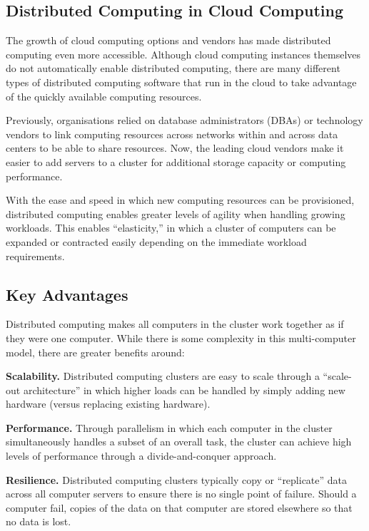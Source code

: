 \documentclass[../report.tex]{subfiles}
\begin{document}
\subsection{Distributed Computing in Cloud Computing}

The growth of cloud computing options and vendors has made distributed computing even more accessible. Although cloud computing instances themselves do not automatically enable distributed computing, there are many different types of distributed computing software that run in the cloud to take advantage of the quickly available computing resources.

Previously, organisations relied on database administrators (DBAs) or technology vendors to link computing resources across networks within and across data centers to be able to share resources. Now, the leading cloud vendors make it easier to add servers to a cluster for additional storage capacity or computing performance.

With the ease and speed in which new computing resources can be provisioned, distributed computing enables greater levels of agility when handling growing workloads. This enables “elasticity,” in which a cluster of computers can be expanded or contracted easily depending on the immediate workload requirements.

\subsection{Key Advantages}

Distributed computing makes all computers in the cluster work together as if they were one computer. While there is some complexity in this multi-computer model, there are greater benefits around:

\textbf{Scalability.} Distributed computing clusters are easy to scale through a “scale-out architecture” in which higher loads can be handled by simply adding new hardware (versus replacing existing hardware).

\textbf{Performance.} Through parallelism in which each computer in the cluster simultaneously handles a subset of an overall task, the cluster can achieve high levels of performance through a divide-and-conquer approach.

\textbf{Resilience.} Distributed computing clusters typically copy or “replicate” data across all computer servers to ensure there is no single point of failure. Should a computer fail, copies of the data on that computer are stored elsewhere so that no data is lost.
\end{document}
